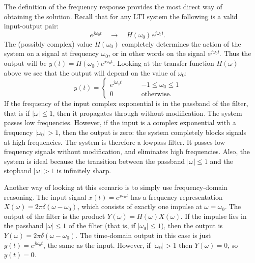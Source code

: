 \documentclass[10pt]{beamer}
\begin{document}
The definition of the frequency response provides the most direct way of obtaining the solution.  Recall that for any LTI system the following is a valid input-output pair:
\begin{equation*}
  e^{j \omega_0 t} \quad \longrightarrow \quad H(\omega_0) e^{j \omega_0 t}.
\end{equation*}
The (possibly complex) value $H(\omega_0)$ completely determines the action of the system on a signal at frequency $\omega_0$, or in other words on the signal $e^{j \omega_0 t}$.  Thus the output will be $y(t) = H(\omega_0) e^{j \omega_0 t}$.  Looking at the transfer function $H(\omega)$ above we see that the output will depend on the value of $\omega_0$:
\begin{equation*}
  y(t) = \begin{cases}
    e^{j \omega_0 t} \qquad & -1 \leq \omega_0 \leq 1 \\
    0 \qquad & \text{otherwise}.
  \end{cases}
\end{equation*}
If the frequency of the input complex exponential is in the passband of the filter, that is if $|\omega| \leq 1$, then it propagates through without modification.  The system passes low frequencies.  However, if the input is a complex exponential with a frequency $|\omega_0| > 1$, then the output is zero:  the system completely blocks signals at high frequencies.   The system is therefore a lowpass filter.  It passes low frequency signals without modification, and eliminates high frequencies.  Also, the system is ideal because the transition between the passband $|\omega| \leq 1$ and the stopband $|\omega|>1$ is infinitely sharp.

Another way of looking at this scenario is to simply use frequency-domain reasoning.  The input signal $x(t) = e^{j \omega_0 t}$ has a frequency representation $X(\omega) = 2 \pi \delta(\omega - \omega_0)$, which consists of exactly one impulse at $\omega = \omega_0$.  The output of the filter is the product $Y(\omega) = H(\omega) X(\omega)$.  If the impulse lies in the passband $|\omega| \leq 1$ of the filter (that is, if $|\omega_0| \leq 1$), then the output is $Y(\omega) = 2 \pi \delta(\omega - \omega_0)$.  The time-domain output in this case is just $y(t) = e^{j \omega_0 t}$, the same as the input.  However, if $|\omega_0| > 1$ then $Y(\omega) = 0$, so $y(t) = 0$.  
\end{document}
